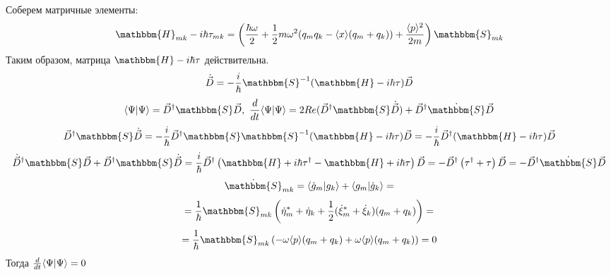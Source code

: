 Соберем матричные элементы:
$$\mathbbm{H}_{mk}-i\hbar\tau_{mk}=\left(\frac{\hbar\omega}{2}+\frac{1}{2}m\omega^2(q_mq_k-\langle x\rangle(q_m+q_k))+\frac{\langle p\rangle^2}{2m}\right)\mathbbm{S}_{mk}$$
Таким образом, матрица $\mathbbm{H}-i\hbar\tau$ действительна.
$$\dot{\vec{D}}=-\frac{i}{\hbar}\mathbbm{S}^{-1}(\mathbbm{H}-i\hbar\tau)\vec{D}$$
$$\myint{\Psi}{\Psi}=\vec{D}^{\dagger}\mathbbm{S}\vec{D},\ %
  \frac{d}{dt}\myint{\Psi}{\Psi}=2Re(\vec{D}^{\dagger}\mathbbm{S}\dot{\vec{D}})+\vec{D}^{\dagger}\dot{\mathbbm{S}}\vec{D}$$
$$\vec{D}^{\dagger}\mathbbm{S}\dot{\vec{D}}=%
  -\frac{i}{\hbar}\vec{D}^{\dagger}\mathbbm{S}\mathbbm{S}^{-1}(\mathbbm{H}-i\hbar\tau)\vec{D}=%
  -\frac{i}{\hbar}\vec{D}^{\dagger}(\mathbbm{H}-i\hbar\tau)\vec{D}$$
$$\dot{\vec{D}}^{\dagger}\mathbbm{S}\vec{D}+\vec{D}^{\dagger}\mathbbm{S}\dot{\vec{D}}=%
  \frac{i}{\hbar}\vec{D}^{\dagger}\left(\mathbbm{H}+i\hbar\tau^{\dagger}-\mathbbm{H}+i\hbar\tau\right)\vec{D}=%
  -\vec{D}^{\dagger}\left(\tau^{\dagger}+\tau\right)\vec{D}=-\vec{D}^{\dagger}\dot{\mathbbm{S}}\vec{D}$$
$$\dot{\mathbbm{S}}_{mk}= \myint{\dot{g}_m}{g_k}+\myint{g_m}{\dot{g}_k}=$$
$$=\frac{1}{\hbar}\mathbbm{S}_{mk}\left(\dot{\eta}_m^*+\dot{\eta}_k+\frac{1}{2}(\dot{\xi}_m^*+\dot{\xi}_k)(q_m+q_k)\right)=$$
$$=\frac{1}{\hbar}\mathbbm{S}_{mk}\left(-\omega\langle p\rangle(q_m+q_k)+\omega\langle p\rangle(q_m+q_k)\right)=0$$
Тогда $\frac{d}{dt}\langle \Psi | \Psi \rangle = 0$

